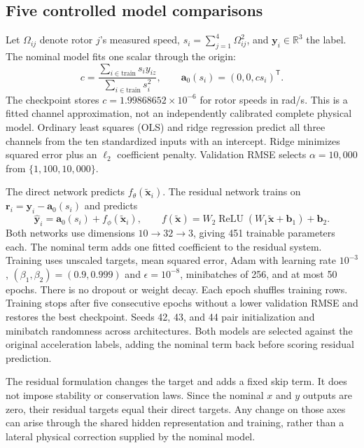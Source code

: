 \documentclass[10pt,letterpaper]{article}
\newcommand{\R}{\mathbb{R}}
\begin{document}
\subsection{Five controlled model comparisons}
Let $\Omega_{ij}$ denote rotor $j$'s measured speed, $s_i=\sum_{j=1}^4\Omega_{ij}^2$, and $\mathbf y_i\in\R^3$ the label. The nominal model fits one scalar through the origin:
\begin{equation}
 c=\frac{\sum_{i\in\mathrm{train}}s_i y_{iz}}{\sum_{i\in\mathrm{train}}s_i^2},
 \qquad \mathbf a_0(s_i)=(0,0,c s_i)^{\mathsf T}.
 \label{eq:nominal}
\end{equation}
The checkpoint stores $c=1.99868652\times10^{-6}$ for rotor speeds in rad/s. This is a fitted channel approximation, not an independently calibrated complete physical model. Ordinary least squares (OLS) and ridge regression predict all three channels from the ten standardized inputs with an intercept. Ridge minimizes squared error plus an $\ell_2$ coefficient penalty. Validation RMSE selects $\alpha=10{,}000$ from $\{1,100,10{,}000\}$.

The direct network predicts $f_\theta(\tilde{\mathbf x}_i)$. The residual network trains on $\mathbf r_i=\mathbf y_i-\mathbf a_0(s_i)$ and predicts
\begin{equation}
 \widehat{\mathbf y}_i=\mathbf a_0(s_i)+f_\phi(\tilde{\mathbf x}_i),\qquad
 f(\tilde{\mathbf x})=W_2\operatorname{ReLU}(W_1\tilde{\mathbf x}+\mathbf b_1)+\mathbf b_2.
 \label{eq:residual}
\end{equation}
Both networks use dimensions $10\!\rightarrow\!32\!\rightarrow\!3$, giving 451 trainable parameters each. The nominal term adds one fitted coefficient to the residual system. Training uses unscaled targets, mean squared error, Adam with learning rate $10^{-3}$, $(\beta_1,\beta_2)=(0.9,0.999)$ and $\epsilon=10^{-8}$, minibatches of 256, and at most 50 epochs. There is no dropout or weight decay. Each epoch shuffles training rows. Training stops after five consecutive epochs without a lower validation RMSE and restores the best checkpoint. Seeds 42, 43, and 44 pair initialization and minibatch randomness across architectures. Both models are selected against the original acceleration labels, adding the nominal term back before scoring residual prediction.

The residual formulation changes the target and adds a fixed skip term. It does not impose stability or conservation laws. Since the nominal $x$ and $y$ outputs are zero, their residual targets equal their direct targets. Any change on those axes can arise through the shared hidden representation and training, rather than a lateral physical correction supplied by the nominal model.
\end{document}

